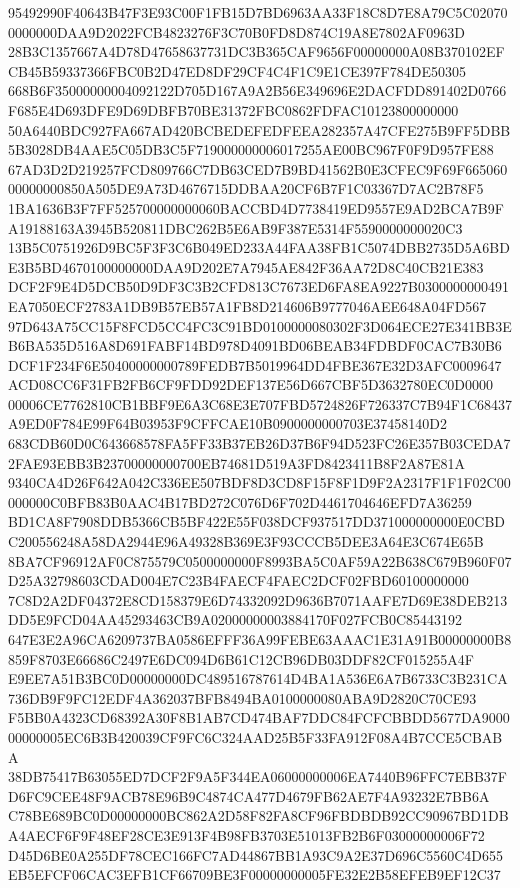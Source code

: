 \documentclass[UTF8,fontset=fandol,zihao=-4,a4paper]{ctexart}
\begin{document}
{{95492990F40643B47F3E93C00F1FB15D7BD6963AA33F18C8D7E8A79C5C020700000000DAA9D2022FCB4823276F3C70B0FD8D874C19A8E7802AF0963D
28B3C1357667A4D78D47658637731DC3B365CAF9656F00000000A08B370102EFCB45B59337366FBC0B2D47ED8DF29CF4C4F1C9E1CE397F784DE50305
668B6F35000000004092122D705D167A9A2B56E349696E2DACFDD891402D0766F685E4D693DFE9D69DBFB70BE31372FBC0862FDFAC10123800000000
50A6440BDC927FA667AD420BCBEDEFEDFEEA282357A47CFE275B9FF5DBB5B3028DB4AAE5C05DB3C5F719000000006017255AE00BC967F0F9D957FE88
67AD3D2D219257FCD809766C7DB63CED7B9BD41562B0E3CFEC9F69F66506000000000850A505DE9A73D4676715DDBAA20CF6B7F1C03367D7AC2B78F5
1BA1636B3F7FF525700000000060BACCBD4D7738419ED9557E9AD2BCA7B9FA19188163A3945B520811DBC262B5E6AB9F387E5314F5590000000020C3
13B5C0751926D9BC5F3F3C6B049ED233A44FAA38FB1C5074DBB2735D5A6BDE3B5BD4670100000000DAA9D202E7A7945AE842F36AA72D8C40CB21E383
DCF2F9E4D5DCB50D9DF3C3B2CFD813C7673ED6FA8EA9227B0300000000491EA7050ECF2783A1DB9B57EB57A1FB8D214606B9777046AEE648A04FD567
97D643A75CC15F8FCD5CC4FC3C91BD0100000080302F3D064ECE27E341BB3EB6BA535D516A8D691FABF14BD978D4091BD06BEAB34FDBDF0CAC7B30B6
DCF1F234F6E50400000000789FEDB7B5019964DD4FBE367E32D3AFC0009647ACD08CC6F31FB2FB6CF9FDD92DEF137E56D667CBF5D3632780EC0D0000
00006CE7762810CB1BBF9E6A3C68E3E707FBD5724826F726337C7B94F1C68437A9ED0F784E99F64B03953F9CFFCAE10B0900000000703E37458140D2
683CDB60D0C643668578FA5FF33B37EB26D37B6F94D523FC26E357B03CEDA72FAE93EBB3B23700000000700EB74681D519A3FD8423411B8F2A87E81A
9340CA4D26F642A042C336EE507BDF8D3CD8F15F8F1D9F2A2317F1F1F02C00000000C0BFB83B0AAC4B17BD272C076D6F702D4461704646EFD7A36259
BD1CA8F7908DDB5366CB5BF422E55F038DCF937517DD371000000000E0CBDC200556248A58DA2944E96A49328B369E3F93CCCB5DEE3A64E3C674E65B
8BA7CF96912AF0C875579C0500000000F8993BA5C0AF59A22B638C679B960F07D25A32798603CDAD004E7C23B4FAECF4FAEC2DCF02FBD60100000000
7C8D2A2DF04372E8CD158379E6D74332092D9636B7071AAFE7D69E38DEB213DD5E9FCD04AA45293463CB9A02000000003884170F027FCB0C85443192
647E3E2A96CA6209737BA0586EFFF36A99FEBE63AAAC1E31A91B00000000B8859F8703E66686C2497E6DC094D6B61C12CB96DB03DDF82CF015255A4F
E9EE7A51B3BC0D00000000DC489516787614D4BA1A536E6A7B6733C3B231CA736DB9F9FC12EDF4A362037BFB8494BA0100000080ABA9D2820C70CE93
F5BB0A4323CD68392A30F8B1AB7CD474BAF7DDC84FCFCBBDD5677DA900000000005EC6B3B420039CF9FC6C324AAD25B5F33FA912F08A4B7CCE5CBABA
38DB75417B63055ED7DCF2F9A5F344EA06000000006EA7440B96FFC7EBB37FD6FC9CEE48F9ACB78E96B9C4874CA477D4679FB62AE7F4A93232E7BB6A
C78BE689BC0D00000000BC862A2D58F82FA8CF96FBDBDB92CC90967BD1DBA4AECF6F9F48EF28CE3E913F4B98FB3703E51013FB2B6F03000000006F72
D45D6BE0A255DF78CEC166FC7AD44867BB1A93C9A2E37D696C5560C4D655EB5EFCF06CAC3EFB1CF66709BE3F00000000005FE32E2B58EFEB9EF12C37
}}
\end{document}
